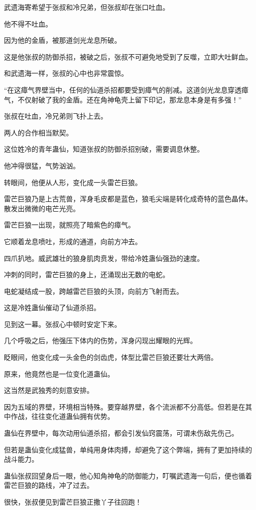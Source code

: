 \begin{this_body}
武遗海寄希望于张叔和冷兄弟，但张叔却在张口吐血。

他不得不吐血。

因为他的金盾，被那道剑光龙息所破。

这是他张叔的防御杀招，被破之后，张叔不可避免地受到了反噬，立即大吐鲜血。

和武遗海一样，张叔的心中也非常震惊。

“在这瘴气界壁当中，任何的仙道杀招都要受到瘴气的削减。这道剑光龙息穿透瘴气，不仅射破了我的金盾。还在角神龟壳上留下印记，那龙息本身是有多强！”

张叔在吐血，冷兄弟则飞扑上去。

两人的合作相当默契。

这位姓冷的青年蛊仙，知道张叔的防御杀招别破，需要调息休整。

他冲得很猛，气势汹汹。

转眼间，他便从人形，变化成一头雷芒巨狼。

雷芒巨狼乃是上古荒兽，浑身毛皮都是蓝色，狼毛尖端是转化成奇特的蓝色晶体。散发出微微的电芒光亮。

雷芒巨狼一出现，就照亮了暗紫色的瘴气。

它顺着龙息喷吐，形成的通道，向前方冲去。

四爪扒地。威武雄壮的狼身肌肉贲发，带给冷姓蛊仙强劲的速度。

冲刺的同时，雷芒巨狼的身上，还涌现出无数的电蛇。

电蛇凝结成一股，跨越雷芒巨狼的头顶，向前方飞射而去。

这是冷姓蛊仙催动了仙道杀招。

见到这一幕。张叔心中顿时安定下来。

几个呼吸之后，他强压下体内的伤势，浑身闪现出耀眼的光辉。

眨眼间，他变化成一头金色的剑齿虎，体型比雷芒巨狼还要壮大两倍。

原来，他竟然也是一位变化道蛊仙。

这当然是武独秀的刻意安排。

因为五域的界壁，环境相当特殊。要穿越界壁，各个流派都不分高低。但若是在其中作战，往往变化道蛊仙拥有优势。

蛊仙在界壁中，每次动用仙道杀招，都会引发仙窍震荡，可谓未伤敌先伤己。

但若是蛊仙变化成猛兽，单纯用身体肉搏，却避免了这个弊端，拥有了更加持续的战斗能力。

蛊仙张叔回望身后一眼，他心知角神龟的防御能力，叮嘱武遗海一句后，便也循着雷芒巨狼的路线，冲了过去。

很快，张叔便见到雷芒巨狼正撒丫子往回跑！


\end{this_body}
